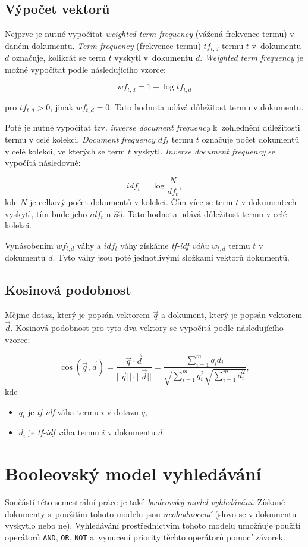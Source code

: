 \documentclass[
11pt,
a4paper,
pdftex,
czech,
titlepage
]{report}
\begin{document}
\subsection{Výpočet vektorů}\label{analyza_vypocet_vekt}
Nejprve je nutné vypočítat \textit{weighted term frequency} (vážená frekvence termu) v daném dokumentu. \textit{Term frequency} (frekvence termu) $tf_{t,d}$ termu $t$ v~dokumentu $d$ označuje, kolikrát se term $t$ vyskytl v~dokumentu $d$. \textit{Weighted term frequency} je možné vypočítat podle následujícího vzorce:

$$wf_{t,d}=1+\log tf_{t,d}$$

\noindent pro $tf_{t,d}>0$, jinak $wf_{t,d}=0$. Tato hodnota udává důležitost termu v dokumentu.

Poté je nutné vypočítat tzv. \textit{inverse document frequency} k~zohlednění důležitosti termu v celé kolekci. \textit{Document frequency} $df_{t}$ termu $t$ označuje počet dokumentů v celé kolekci, ve kterých se term $t$ vyskytl. \textit{Inverse document frequency} se vypočítá následovně:

$$idf_t=\log \frac{N}{df_t},$$
kde $N$ je celkový počet dokumentů v kolekci. Čím více se term $t$ v dokumentech vyskytl, tím bude jeho $idf_t$ nižší. Tato hodnota udává důležitost termu v celé kolekci.

Vynásobením $wf_{t,d}$ váhy a $idf_t$ váhy získáme \textit{tf-idf váhu} $w_{t,d}$ termu $t$ v dokumentu $d$. Tyto váhy jsou poté jednotlivými složkami vektorů dokumentů.

\subsection{Kosinová podobnost}\label{analyza_kosin}
Mějme dotaz, který je popsán vektorem $\vec{q}$ a dokument, který je popsán vektorem $\vec{d}$. Kosinová podobnost pro tyto dva vektory se vypočítá podle následujícího vzorce:

$$\cos(\vec{q},\vec{d})=\frac{\vec{q} \cdot \vec{d}}{||\vec{q}|| \cdot ||\vec{d}||}=\frac{\sum_{i=1}^{m} q_i d_i}{\sqrt{\sum_{i=1}^{m} q_{i}^2} \sqrt{\sum_{i=1}^{m} d_{i}^2}},$$
\noindent kde 
\begin{itemize}
    \item $q_i$ je \textit{tf-idf} váha termu $i$ v dotazu $q$,
    \item $d_i$ je \textit{tf-idf} váha termu $i$ v dokumentu $d$.
\end{itemize}

\section{Booleovský model vyhledávání}
Součástí této semestrální práce je také \textit{booleovský model vyhledávání}. Získané dokumenty s~použitím tohoto modelu jsou \textit{neohodnocené} (slovo se v dokumentu vyskytlo nebo ne). Vyhledávání prostřednictvím tohoto modelu umožňuje použití operátorů \texttt{AND}, \texttt{OR}, \texttt{NOT} a~vynucení priority těchto operátorů pomocí závorek.
\end{document}
